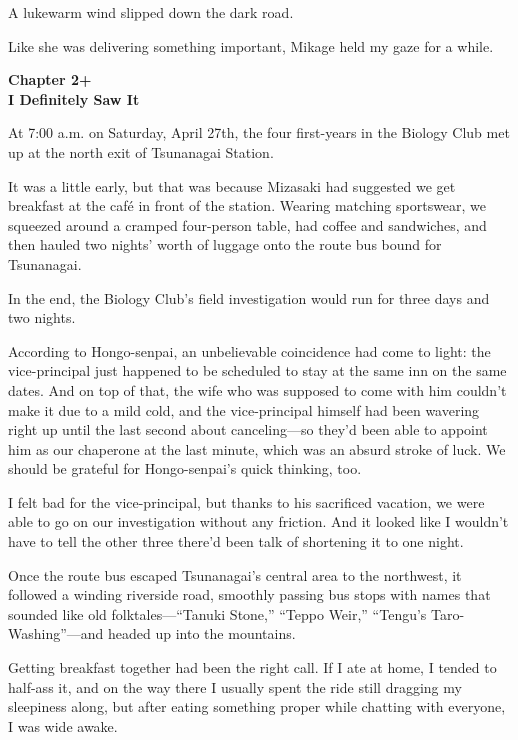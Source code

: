 \documentclass[
    a4paper,
    12pt,
    twoside,
    openany,
    UTF8,
    fontset=windows
]{ctexbook}
\begin{document}
A lukewarm wind slipped down the dark road.

Like she was delivering something important, Mikage held my gaze for a while.


\clearpage
\thispagestyle{plain}
\begin{center}
    \large\bfseries
    Chapter 2+\\
    I Definitely Saw It
\end{center}
\label{sec:ch2p}
\vspace{1cm}

At 7:00 a.m. on Saturday, April 27th, the four first-years in the Biology Club met up at the north exit of Tsunanagai Station.

It was a little early, but that was because Mizasaki had suggested we get breakfast at the café in front of the station. Wearing matching sportswear, we squeezed around a cramped four-person table, had coffee and sandwiches, and then hauled two nights' worth of luggage onto the route bus bound for Tsunanagai.

In the end, the Biology Club's field investigation would run for three days and two nights.

According to Hongo-senpai, an unbelievable coincidence had come to light: the vice-principal just happened to be scheduled to stay at the same inn on the same dates. And on top of that, the wife who was supposed to come with him couldn't make it due to a mild cold, and the vice-principal himself had been wavering right up until the last second about canceling---so they'd been able to appoint him as our chaperone at the last minute, which was an absurd stroke of luck. We should be grateful for Hongo-senpai's quick thinking, too.

I felt bad for the vice-principal, but thanks to his sacrificed vacation, we were able to go on our investigation without any friction. And it looked like I wouldn't have to tell the other three there'd been talk of shortening it to one night.

Once the route bus escaped Tsunanagai's central area to the northwest, it followed a winding riverside road, smoothly passing bus stops with names that sounded like old folktales---``Tanuki Stone,'' ``Teppo Weir,'' ``Tengu's Taro-Washing''---and headed up into the mountains.

Getting breakfast together had been the right call. If I ate at home, I tended to half-ass it, and on the way there I usually spent the ride still dragging my sleepiness along, but after eating something proper while chatting with everyone, I was wide awake.
\end{document}
